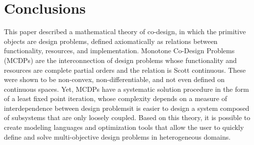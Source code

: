 \documentclass[twocolumn,english]{IEEEtran}
\theoremstyle{definition}
\theoremstyle{plain}
\theoremstyle{definition}
\theoremstyle{remark}
\theoremstyle{definition}
\theoremstyle{plain}
\theoremstyle{plain}
\newcommand{\scottcontinuous}{Scott continuous\xspace}
\begin{document}
\section{Conclusions}

This paper described a mathematical theory of co-design, in which
the primitive objects are design problems, defined axiomatically as
relations between functionality, resources, and implementation. Monotone
Co-Design Problems (MCDPs) are the interconnection of design problems
whose functionality and resources are complete partial orders and
the relation is \scottcontinuous. These were shown to be non-convex,
non-differentiable, and not even defined on continuous spaces. Yet,
MCDPs have a systematic solution procedure in the form of a least
fixed point iteration, whose complexity depends on a measure of interdependence
between design problems\textemdash it is easier to design a system
composed of subsystems that are only loosely coupled. Based on this
theory, it is possible to create modeling languages and optimization
tools that allow the user to quickly define and solve multi-objective
design problems in heterogeneous domains. 

\textbf{\small{}}{\small \par}






\footnotesize



\setcounter{page}{1}


\printbibliography
\end{document}
